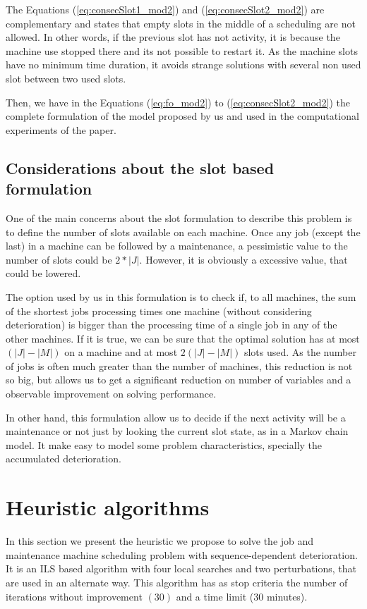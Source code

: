 \documentclass[a4paper,11pt]{article}
\begin{document}
The Equations (\ref{eq:consecSlot1_mod2}) and (\ref{eq:consecSlot2_mod2}) are complementary and states that empty slots in the middle of a scheduling are not allowed. In other words, if the previous slot has not activity, it is because the machine use stopped there and its not possible to restart it. As the machine slots have no minimum time duration, it avoids strange solutions with several non used slot between two used slots. 

Then, we have in the Equations (\ref{eq:fo_mod2}) to (\ref{eq:consecSlot2_mod2}) the complete formulation of the model proposed by us and used in the computational experiments of the paper. 



\subsection{Considerations about the slot based formulation}
One of the main concerns about the slot formulation to describe this problem is to define the number of slots available on each machine. Once any job (except the last) in a machine can be followed by a maintenance, a pessimistic value to the number of slots could be $2*|J|$. However, it is obviously a excessive value, that could be lowered. 

The option used by us in this formulation is to check if, to all machines, the sum of the shortest jobs processing times one machine (without considering deterioration) is bigger than the processing time of a single job in any of the other machines. If it is true, we can be sure that the optimal solution has at most $(|J| - |M|)$ on a machine and at most $2(|J| - |M|)$ slots used. As the number of jobs is often much greater than the number of machines, this reduction is not so big, but allows us to get a significant reduction on number of variables and a observable improvement on solving performance.  

In other hand, this formulation allow us to decide if the next activity will be a maintenance or not just by looking the current slot state, as in a Markov chain model. It make easy to model some problem characteristics, specially the accumulated deterioration. 

\section{Heuristic algorithms}

In this section we present the heuristic we propose to solve the job and maintenance machine scheduling problem with sequence-dependent deterioration. It is an ILS based algorithm with four local searches and two perturbations, that are used in an alternate way.  This algorithm has as stop criteria the number of iterations without improvement $(30)$ and a time limit ($30$ minutes). 
\end{document}
